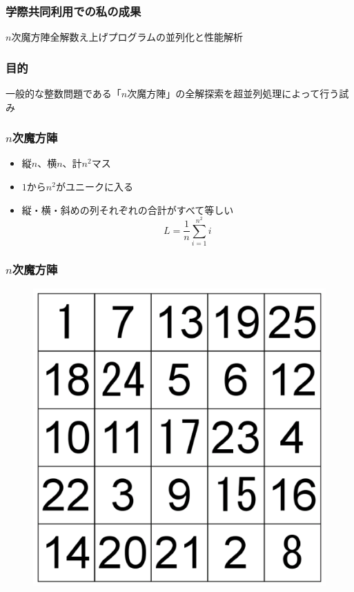 \documentclass[dvipdfmx,20pt,notheorems,t]{beamer}
\begin{document}
\begin{frame}\frametitle{学際共同利用での私の成果}
\centering
\large
\vspace*{\fill}
$n$次魔方陣全解数え上げプログラムの並列化と性能解析
\vspace*{\fill}
\end{frame}

\begin{frame}\frametitle{目的}
一般的な整数問題である「$n$次魔方陣」の全解探索を超並列処理によって行う試み
\end{frame}

\begin{frame}\frametitle{$n$次魔方陣}
\begin{itemize}
\item 縦$n$、横$n$、計$n^2$マス
\item $1$から$n^2$がユニークに入る
\item 縦・横・斜めの列それぞれの合計がすべて等しい \\
\begin{displaymath}
L=\frac{1}{n}\sum_{i=1}^{n^2}i
\end{displaymath}
\end{itemize}
\end{frame}

\begin{frame}\frametitle{$n$次魔方陣}
\begin{figure}[htb]
\centering
\includegraphics[height=0.6\textheight]{ms.eps}
\end{figure}
\end{frame}
\end{document}
